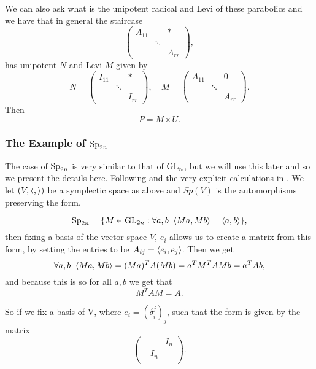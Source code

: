    We can also ask what is the unipotent radical and Levi of these parabolics and we have that in general the staircase 
   \[\begin{pmatrix}
       A_{11} && \ast\\
        & \ddots & \\
        && A_{rr}
   \end{pmatrix},\]
   has unipotent \(N\) and Levi \(M\) given by 
   \[N = \begin{pmatrix}
       I_{11} && \ast\\
        & \ddots & \\
        && I_{rr}
   \end{pmatrix}, \quad M = \begin{pmatrix}
       A_{11} && 0\\
        & \ddots & \\
        && A_{rr}
   \end{pmatrix}.\]
   Then 
   \[P = M\ltimes U.\]

\subsubsection{The Example of \(\operatorname{Sp}_{2n}\)}
The case of \(\operatorname{Sp}_{2n}\) is very similar to that of \(\operatorname{GL}_n\), but we will use this later and so we present the details here. Following \cite{conradStandardParabolicSubgroups} and the very explicit calculations in  \cite[\S 8]{BuildingsClassicalGroups}. We let \((V, \langle ,\rangle)\) be a symplectic space as above and \(Sp(V)\) is the automorphisms preserving the form.
\begin{example}
    \[\operatorname{Sp}_{2n} = \{M\in \operatorname{GL}_{2n} :\forall a,b \;\; \langle Ma, Mb\rangle = \langle a,b\rangle\},\]
    then fixing a basis of the vector space \(V\), \(e_i\) allows us to create a matrix from this form, by setting the entries to be \(A_{ij} = \langle e_i, e_j\rangle\). Then we get 
        \[\forall a,b \;\; \langle Ma, Mb\rangle = (Ma)^T A (Mb) = a^T M^T A M b= a^TAb, \]
        and because this is so for all \(a,b\) we get that 
        \[M^T A M = A.\]

        So if we fix a basis of V, where \(e_i = (\delta_i^j)_j\), such that the form is given by the matrix
        \[\begin{pmatrix}
             & I_n \\
            -I_n & \\
        \end{pmatrix}.\]
\end{example}

